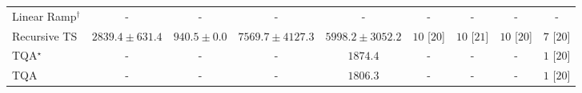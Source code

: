 \begin{tabular}{l|cccc|cccc|}
Linear Ramp$^\dagger$ & {\cellcolor[HTML]{000000}} \color[HTML]{F1F1F1} {\cellcolor{white}} \color{black} - & {\cellcolor[HTML]{000000}} \color[HTML]{F1F1F1} {\cellcolor{white}} \color{black} - & {\cellcolor[HTML]{000000}} \color[HTML]{F1F1F1} {\cellcolor{white}} \color{black} - & {\cellcolor[HTML]{000000}} \color[HTML]{F1F1F1} {\cellcolor{white}} \color{black} - & {\cellcolor[HTML]{000000}} \color[HTML]{F1F1F1} {\cellcolor{white}} \color{black} - & {\cellcolor[HTML]{000000}} \color[HTML]{F1F1F1} {\cellcolor{white}} \color{black} - & {\cellcolor[HTML]{000000}} \color[HTML]{F1F1F1} {\cellcolor{white}} \color{black} - & {\cellcolor[HTML]{000000}} \color[HTML]{F1F1F1} {\cellcolor{white}} \color{black} - \\
Recursive TS & {\cellcolor[HTML]{C4CBE3}} \color[HTML]{000000} $2839.4\pm 631.4$ & {\cellcolor[HTML]{FFF7FB}} \color[HTML]{000000} $940.5\pm 0.0$ & {\cellcolor[HTML]{023858}} \color[HTML]{F1F1F1} $7569.7\pm 4127.3$ & {\cellcolor[HTML]{056DAC}} \color[HTML]{F1F1F1} $5998.2\pm 3052.2$ & {\cellcolor[HTML]{49006A}} \color[HTML]{F1F1F1} $10$ [$20$] & {\cellcolor[HTML]{49006A}} \color[HTML]{F1F1F1} $10$ [$21$] & {\cellcolor[HTML]{49006A}} \color[HTML]{F1F1F1} $10$ [$20$] & {\cellcolor[HTML]{CD238F}} \color[HTML]{F1F1F1} $7$ [$20$] \\
TQA$^\star$ & {\cellcolor[HTML]{000000}} \color[HTML]{F1F1F1} {\cellcolor{white}} \color{black} - & {\cellcolor[HTML]{000000}} \color[HTML]{F1F1F1} {\cellcolor{white}} \color{black} - & {\cellcolor[HTML]{000000}} \color[HTML]{F1F1F1} {\cellcolor{white}} \color{black} - & {\cellcolor[HTML]{E8E4F0}} \color[HTML]{000000} $1874.4$ & {\cellcolor[HTML]{000000}} \color[HTML]{F1F1F1} {\cellcolor{white}} \color{black} - & {\cellcolor[HTML]{000000}} \color[HTML]{F1F1F1} {\cellcolor{white}} \color{black} - & {\cellcolor[HTML]{000000}} \color[HTML]{F1F1F1} {\cellcolor{white}} \color{black} - & {\cellcolor[HTML]{FFF7F3}} \color[HTML]{000000} $1$ [$20$] \\
TQA & {\cellcolor[HTML]{000000}} \color[HTML]{F1F1F1} {\cellcolor{white}} \color{black} - & {\cellcolor[HTML]{000000}} \color[HTML]{F1F1F1} {\cellcolor{white}} \color{black} - & {\cellcolor[HTML]{000000}} \color[HTML]{F1F1F1} {\cellcolor{white}} \color{black} - & {\cellcolor[HTML]{EBE6F2}} \color[HTML]{000000} $1806.3$ & {\cellcolor[HTML]{000000}} \color[HTML]{F1F1F1} {\cellcolor{white}} \color{black} - & {\cellcolor[HTML]{000000}} \color[HTML]{F1F1F1} {\cellcolor{white}} \color{black} - & {\cellcolor[HTML]{000000}} \color[HTML]{F1F1F1} {\cellcolor{white}} \color{black} - & {\cellcolor[HTML]{FFF7F3}} \color[HTML]{000000} $1$ [$20$] \\
\cline{1-9}
\bottomrule
\end{tabular}
